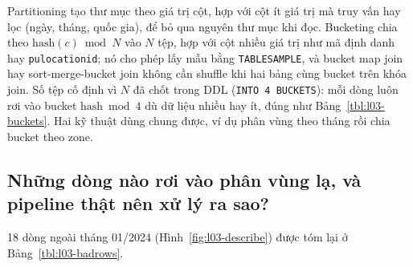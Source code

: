 \documentclass[
  12pt,
  a4paper,
]{article}
\begin{document}
Partitioning tạo thư mục theo giá trị cột, hợp với cột ít giá trị mà
truy vấn hay lọc (ngày, tháng, quốc gia), để bỏ qua nguyên thư mục khi
đọc. Bucketing chia theo \(\text{hash}(c) \bmod N\) vào \(N\) tệp, hợp
với cột nhiều giá trị như mã định danh hay \texttt{pulocationid}; nó cho
phép lấy mẫu bằng \texttt{TABLESAMPLE}, và bucket map join hay
sort-merge-bucket join không cần shuffle khi hai bảng cùng bucket trên
khóa join. Số tệp cố định vì \(N\) đã chốt trong DDL
(\texttt{INTO\ 4\ BUCKETS}): mỗi dòng luôn rơi vào bucket
\(\text{hash} \bmod 4\) dù dữ liệu nhiều hay ít, đúng như
Bảng~\ref{tbl:l03-buckets}. Hai kỹ thuật dùng chung được, ví dụ phân
vùng theo tháng rồi chia bucket theo zone.

\subsection{Những dòng nào rơi vào phân vùng lạ, và pipeline thật nên xử
lý ra sao?}\label{sec:l03-q8}

18 dòng ngoài tháng 01/2024 (Hình~\ref{fig:l03-describe}) được tóm lại ở
Bảng~\ref{tbl:l03-badrows}.
\end{document}
